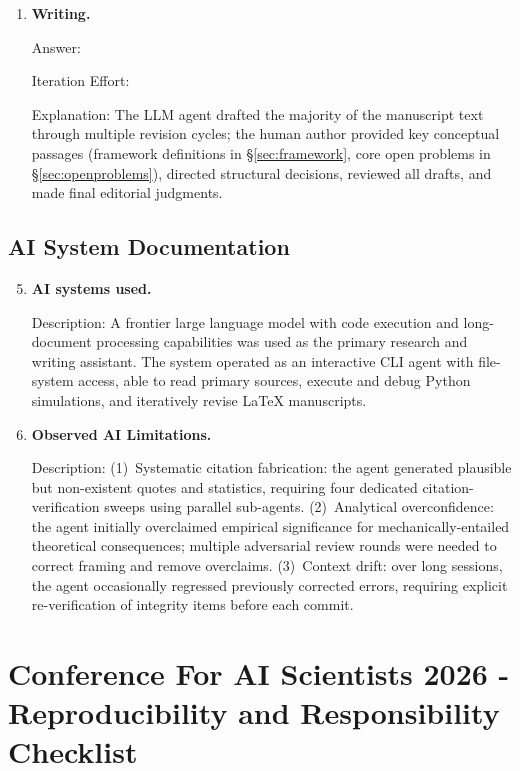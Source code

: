 \documentclass{article}
\begin{document}
\begin{enumerate}
  \item \textbf{Writing.}

    Answer: \involvementC{}

    Iteration Effort: \iterationHigh{}

    Explanation: The LLM agent drafted the majority of the manuscript text through multiple revision cycles; the human author provided key conceptual passages (framework definitions in \S\ref{sec:framework}, core open problems in \S\ref{sec:openproblems}), directed structural decisions, reviewed all drafts, and made final editorial judgments.

\end{enumerate}

\subsection*{AI System Documentation}

\begin{enumerate}
  \setcounter{enumi}{4}

  \item \textbf{AI systems used.}

    Description: A frontier large language model with code execution and long-document processing capabilities was used as the primary research and writing assistant. The system operated as an interactive CLI agent with file-system access, able to read primary sources, execute and debug Python simulations, and iteratively revise LaTeX manuscripts.

  \item \textbf{Observed AI Limitations.}

    Description: (1)~Systematic citation fabrication: the agent generated plausible but non-existent quotes and statistics, requiring four dedicated citation-verification sweeps using parallel sub-agents. (2)~Analytical overconfidence: the agent initially overclaimed empirical significance for mechanically-entailed theoretical consequences; multiple adversarial review rounds were needed to correct framing and remove overclaims. (3)~Context drift: over long sessions, the agent occasionally regressed previously corrected errors, requiring explicit re-verification of integrity items before each commit.

\end{enumerate}

\newpage

\section*{Conference For AI Scientists 2026 - Reproducibility and Responsibility Checklist}
\label{checklist_reproducibility}
\end{document}

